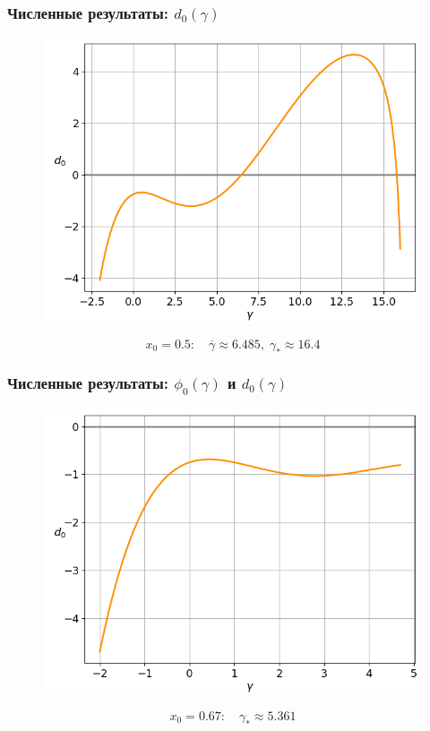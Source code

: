 \documentclass[fullscreen=true, unicode, bookmarks=false]{beamer}
\begin{document}
\begin{frame}
\frametitle{ Численные результаты: $ d_0(\gamma) $ }

\begin{figure} 
\includegraphics[scale=0.55]{divergent_d0_0,50.png}  
\end{figure}

$$ x_0 = 0.5: \quad \overline{\gamma} \approx 6.485, \; \gamma_* \approx 16.4 $$

\end{frame}

\begin{frame}
\frametitle{ Численные результаты: $ \phi_0(\gamma) $ и $ d_0(\gamma) $ }

\begin{figure} 
\includegraphics[scale=0.55]{divergent_d0_0,67.png}  
\end{figure}

$$ x_0 = 0.67: \quad \gamma_* \approx 5.361 $$

\end{frame}
\end{document}
